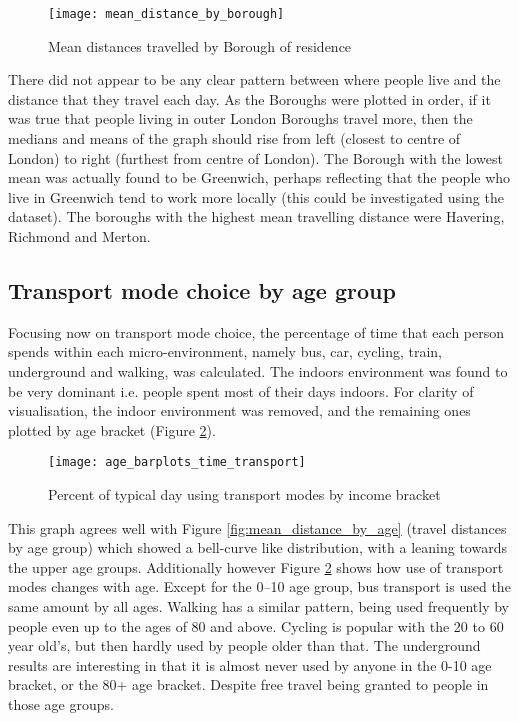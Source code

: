 \begin{landscape}

\begin{figure}[H]
\centering
\texttt{[image: mean\_distance\_by\_borough]}
\caption{Mean distances travelled by Borough of residence}
\label{fig:mean_distance_by_borough}
\end{figure}

\end{landscape}

There did not appear to be any clear pattern between where people live and the distance that they travel each day. As the Boroughs were plotted in order, if it was true that people living in outer London Boroughs travel more, then the medians and means of the graph should rise from left (closest to centre of London) to right (furthest from centre of London). The Borough with the lowest mean was actually found to be Greenwich, perhaps reflecting that the people who live in Greenwich tend to work more locally (this could be investigated using the dataset). The boroughs with the highest mean travelling distance were Havering, Richmond and Merton.

\subsection{Transport mode choice by age group}
\label{sec:transport_mode_choice_by_age_group}

Focusing now on transport mode choice, the percentage of time that each person spends within each micro-environment, namely bus, car, cycling, train, underground and walking, was calculated. The indoors environment was found to be very dominant i.e. people spent most of their days indoors. For clarity of visualisation, the indoor environment was removed, and the remaining ones plotted by age bracket (Figure \ref{fig:age_barplots_time_transport}).

\begin{figure}[H]
\centering
\texttt{[image: age\_barplots\_time\_transport]}
\caption{Percent of typical day using transport modes by income bracket}
\label{fig:age_barplots_time_transport}
\end{figure}

This graph agrees well with Figure \ref{fig:mean_distance_by_age} (travel distances by age group) which showed a bell-curve like distribution, with a leaning towards the upper age groups. Additionally however Figure \ref{fig:age_barplots_time_transport} shows how use of transport modes changes with age. Except for the 0--10 age group, bus transport is used the same amount by all ages. Walking has a similar pattern, being used frequently by people even up to the ages of 80 and above. Cycling is popular with the 20 to 60 year old's, but then hardly used by people older than that. The underground results are interesting in that it is almost never used by anyone in the 0-10 age bracket, or the 80+ age bracket. Despite free travel being granted to people in those age groups.

